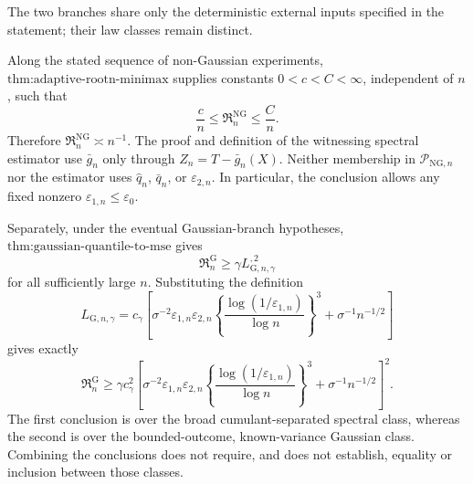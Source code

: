 The two branches share only the deterministic external inputs specified in the statement; their law classes remain distinct.

Along the stated sequence of non-Gaussian experiments, \(\text{thm:adaptive-rootn-minimax}\) supplies constants \(0<c<C<\infty\), independent of \(n\), such that
\[
 \frac cn\le\mathfrak R_n^{\mathrm{NG}}\le\frac Cn.
\]
Therefore \(\mathfrak R_n^{\mathrm{NG}}\asymp n^{-1}\).  The proof and definition of the witnessing spectral estimator use \(\bar g_n\) only through \(Z_n=T-\bar g_n(X)\).  Neither membership in \(\mathcal P_{\mathrm{NG},n}\) nor the estimator uses \(\widehat q_n\), \(\bar q_n\), or \(\varepsilon_{2,n}\).  In particular, the conclusion allows any fixed nonzero \(\varepsilon_{1,n}\le\varepsilon_0\).

Separately, under the eventual Gaussian-branch hypotheses, \(\text{thm:gaussian-quantile-to-mse}\) gives
\[
 \mathfrak R_n^{\mathrm G}\ge\gamma L_{\mathrm G,n,\gamma}^{,2}
\]
for all sufficiently large \(n\).  Substituting the definition
\[
 L_{\mathrm G,n,\gamma}
 =c_{\gamma}\left[
 \sigma^{-2}\varepsilon_{1,n}\varepsilon_{2,n}
 \left\{\frac{\log(1/\varepsilon_{1,n})}{\log n}\right\}^{3}
 +\sigma^{-1}n^{-1/2}
 \right]
\]
gives exactly
\[
 \mathfrak R_n^{\mathrm G}\ge\gamma c_{\gamma}^{2}
 \left[
 \sigma^{-2}\varepsilon_{1,n}\varepsilon_{2,n}
 \left\{\frac{\log(1/\varepsilon_{1,n})}{\log n}\right\}^{3}
 +\sigma^{-1}n^{-1/2}
 \right]^2.
\]
The first conclusion is over the broad cumulant-separated spectral class, whereas the second is over the bounded-outcome, known-variance Gaussian class.  Combining the conclusions does not require, and does not establish, equality or inclusion between those classes.
